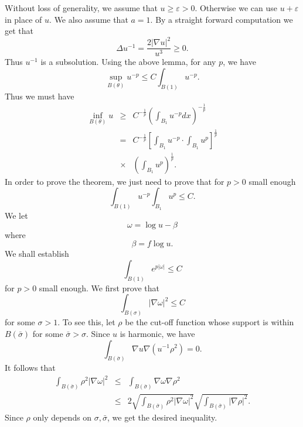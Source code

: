 Without loss of generality, we assume that $ u \geq \varepsilon > 0 $. Otherwise we can use  $u + \varepsilon $ in place of $ u$. We also assume that $ a = 1$. By a straight forward computation we get that 
%
\[\Delta u^{-1} = \frac{2|\nabla u|^2}{u^3} \geq 0.\]
%
Thus $ u^{-1} $ is a subsolution. Using the above lemma, for any $p$, we have 
%
\[\sup _{B(\theta)} u^{-p} \leq C \int_{B(1)} u ^{-p} .\]
%
Thus we must have 
%
\begin{eqnarray*}
\inf _{B(\theta)}u & \geq & C ^{-\frac{1}{p}} \left( \int_{B_{1}} u^{-p} d x \right) ^{-\frac{1}{p}} \\
& = &C ^{-\frac{1}{p}} \left[\int_{B_{1}} u^{-p} \cdot \int_{B_{1}} u^{p} \right] ^{\frac{1}{p}} \\
&    \times& \left( \int_{B_{1}} u^{p} \right) ^{\frac{1}{p}} .\end{eqnarray*}
%
In order to prove the theorem, we just need to prove that for $ p > 0 $ small enough
%
\[ \int_{B(1)} u^{-p} \int _{B_1} u^p \leq C. \]
%
We let
%
\[ \omega = \log u - \beta \]
%
where
%
\[\beta = f \log u. \]
%
We shall establish
%
\begin{equation}\int_{B(1) } e ^{p |\omega |}\leq C  \tag{$\star$} \end{equation}
%
for $ p > 0 $ small enough. We first prove that 
%
\[ \int_{B(\sigma)} | \nabla \omega |^2 \leq C \]
%
for some $ \sigma > 1 $. To see this, let $ \rho $ be the cut-off function whose support is within $ B(\bar{\sigma})$ for some $ \bar{\sigma} > \sigma $. Since $ u$ is harmonic, we have 
%
\[ \int _{B(\bar{\sigma})} \nabla u \nabla ( u^{-1} \rho ^2) = 0. \]
%
It follows that 
%
\begin{eqnarray*}
\int_{B(\bar{\sigma})} \rho^2 |\nabla \omega |^2 & \leq & \int_{B(\bar{\sigma})} \nabla \omega \nabla \rho^2\\
&  \leq&2 \sqrt{\int_{B(\bar{\sigma})}\rho^2 |\nabla \omega |^2  }\sqrt{\int_{B(\bar{\sigma})}  |\nabla \rho |^2} .
\end{eqnarray*}
%
Since $\rho$ only depends on $ \sigma , \bar{\sigma}$, we get the desired inequality.


